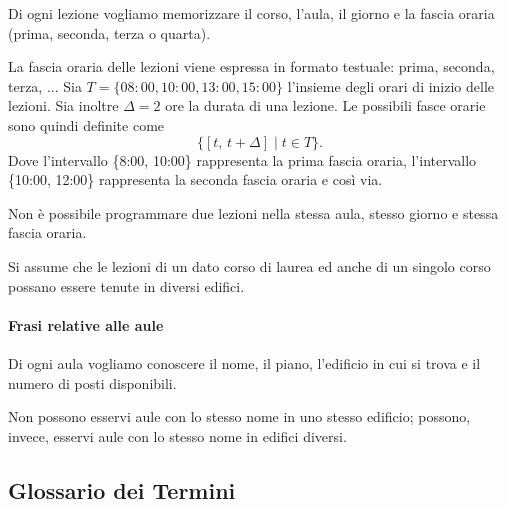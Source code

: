 \documentclass[a4paper,11pt]{article}
\begin{document}
Di ogni lezione vogliamo memorizzare il corso, l'aula, il giorno e la fascia oraria (prima, seconda, terza o quarta).

La fascia oraria delle lezioni viene espressa in formato testuale: prima, seconda, terza, ...
Sia $ T = \{08{:}00, 10{:}00, 13{:}00, 15{:}00\}$ l'insieme degli orari di inizio delle lezioni.
Sia inoltre $\Delta = 2 \text{ ore}$ la durata di una lezione.
Le possibili fasce orarie sono quindi definite come
$$
\{[t,\, t+\Delta] \mid t \in T\}.
$$
Dove l'intervallo \{8:00, 10:00\} rappresenta la prima fascia oraria, l'intervallo \{10:00, 12:00\} rappresenta la seconda fascia oraria e così via.

Non è possibile programmare due lezioni nella stessa aula, stesso giorno e stessa fascia oraria.

Si assume che le lezioni di un dato corso di laurea ed anche di un  singolo corso possano essere tenute in diversi edifici.


\paragraph{Frasi relative alle aule}

Di ogni aula vogliamo conoscere il nome, il piano, l'edificio in cui si trova e il numero di posti disponibili.

Non possono esservi aule con lo stesso nome in uno stesso edificio; possono, invece, esservi aule con lo stesso nome in edifici diversi.

\subsection{Glossario dei Termini}
\end{document}
